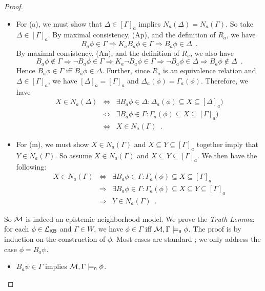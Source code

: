 \documentclass[12pt]{article}
\theoremstyle{definition}
\newcommand{\M}{{\cal M}}      %
\newcommand{\Lang}{{\cal L}}   %
\newcommand{\KB}{{\mathsf{KB}}}                     %
\newcommand{\modelsn}{\models_{\mathsf{n}}}                  %
\begin{document}
\begin{proof}
\begin{itemize}
  \item For (a), we must show that $\Delta\in[\Gamma]_a$ implies
    $N_a(\Delta)=N_a(\Gamma)$.  So take $\Delta\in[\Gamma]_a$.  By
    maximal consistency, (Ap), and the definition of $R_a$, we have
    \[
    B_a\phi\in\Gamma \Rightarrow
    K_aB_a\phi\in\Gamma \Rightarrow
    B_a\phi\in\Delta \enspace.
    \]
    By maximal consistency, (An), and the definition of $R_a$, we also
    have
    \[
    B_a\phi\notin\Gamma \Rightarrow
    \lnot B_a\phi\in\Gamma \Rightarrow
    K_a\lnot B_a\phi\in\Gamma \Rightarrow
    \lnot B_a\phi\in\Delta \Rightarrow
    B_a\phi\notin\Delta \enspace.
    \]
    Hence $B_a\phi\in\Gamma$ iff $B_a\phi\in\Delta$.  Further, since
    $R_a$ is an equivalence relation and $\Delta\in[\Gamma]_a$, we
    have $[\Delta]_a=[\Gamma]_a$ and
    $\Delta_a(\phi)=\Gamma_a(\phi)$. Therefore, we have
    \[
    \renewcommand{\arraystretch}{1.3}
    \begin{array}{lcl}
      X\in N_a(\Delta) 
      & \Leftrightarrow &
      \exists B_a\phi\in\Delta:
      \Delta_a(\phi)\subseteq X\subseteq[\Delta]_a)
      \\
      & \Leftrightarrow &
      \exists B_a\phi\in\Gamma:
      \Gamma_a(\phi)\subseteq X\subseteq[\Gamma]_a)
      \\
      & \Leftrightarrow &
      X\in N_a(\Gamma) \enspace.
    \end{array}
    \]

  \item For (m), we must show $X\in N_a(\Gamma)$ and $X\subseteq
    Y\subseteq[\Gamma]_a$ together imply that $Y\in N_a(\Gamma)$.  So
    assume $X\in N_a(\Gamma)$ and $X\subseteq Y\subseteq[\Gamma]_a$.
    We then have the following:
    \[
    \renewcommand{\arraystretch}{1.3}
    \begin{array}{lcl}
      X\in N_a(\Gamma)
      & \Leftrightarrow &
      \exists B_a\phi\in\Gamma:\Gamma_a(\phi)\subseteq X\subseteq[\Gamma]_a
      \\
      & \Rightarrow &
      \exists B_a\phi\in\Gamma:\Gamma_a(\phi)\subseteq
      X\subseteq Y\subseteq[\Gamma]_a
      \\
      & \Rightarrow &
      Y\in N_a(\Gamma)
      \enspace.
    \end{array}
    \]
  \end{itemize}
  So $\M$ is indeed an epistemic neighborhood model.  We prove the
  \emph{Truth Lemma\/}: for each $\phi\in\Lang_\KB$ and $\Gamma\in W$,
  we have $\phi\in\Gamma$ iff $\M,\Gamma\modelsn\phi$.  The proof is
  by induction on the construction of $\phi$.  Most cases are standard
  \cite{BlaRijVen:ml}; we only address the case $\phi=B_a\psi$.
  \begin{itemize}
  \item $B_a\psi\in\Gamma$ implies $\M,\Gamma\modelsn\phi$.


\end{itemize}
\end{proof}
\end{document}
